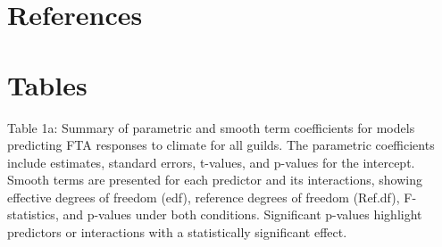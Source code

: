 \documentclass[
]{agujournal2019}
\begin{document}
\section{References}\label{references}

\section{Tables}\label{tables}

Table 1a: Summary of parametric and smooth term coefficients for models
predicting FTA responses to climate for all guilds. The parametric
coefficients include estimates, standard errors, t-values, and p-values
for the intercept. Smooth terms are presented for each predictor and its
interactions, showing effective degrees of freedom (edf), reference
degrees of freedom (Ref.df), F-statistics, and p-values under both
conditions. Significant p-values highlight predictors or interactions
with a statistically significant effect.
\end{document}
